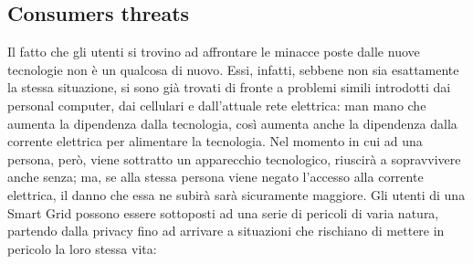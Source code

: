 \subsection{Consumers threats}
Il fatto che gli utenti si trovino ad affrontare le minacce poste dalle nuove tecnologie non è un qualcosa di nuovo. Essi, infatti, sebbene non sia esattamente la stessa situazione, si sono già trovati di fronte a problemi simili introdotti dai personal computer, dai  cellulari e dall'attuale rete elettrica: man mano che aumenta la dipendenza dalla tecnologia, così aumenta anche la dipendenza dalla corrente elettrica per alimentare la tecnologia. Nel momento in cui ad una persona, però, viene sottratto un apparecchio tecnologico, riuscirà a sopravvivere anche senza; ma, se alla stessa persona viene negato l'accesso alla corrente elettrica, il danno che essa ne subirà sarà sicuramente maggiore.\newline
Gli utenti di una Smart Grid possono essere sottoposti ad una serie di pericoli di varia natura, partendo dalla privacy fino ad arrivare a situazioni che rischiano di mettere in pericolo la loro stessa vita:
